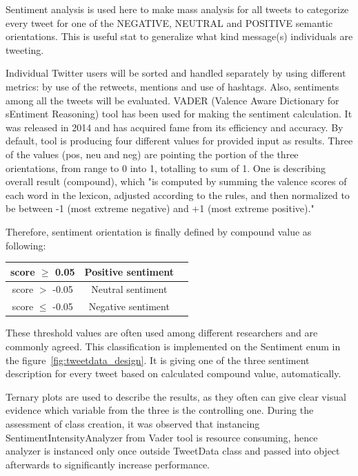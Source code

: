 Sentiment analysis is used here to make mass analysis for all tweets to categorize every tweet for one of the NEGATIVE, NEUTRAL and POSITIVE semantic orientations.
This is useful stat to generalize what kind message(s) individuals are tweeting.

Individual Twitter users will be sorted and handled separately by using different metrics: by use of the retweets, mentions and use of hashtags.
Also, sentiments among all the tweets will be evaluated.
VADER (Valence  Aware  Dictionary  for  sEntiment  Reasoning) tool\cite{Hutto_Gilbert_2014} has been used for making the sentiment calculation.
It was released in 2014 and has acquired fame from its efficiency and accuracy.
By default, tool is producing four different values for provided input as results.
Three of the values (pos, neu and neg) are pointing the portion of the three orientations, from range to 0 into 1, totalling to sum of 1.
One is describing overall result (compound), which "is computed by summing the valence scores of each word in the lexicon, adjusted according to the rules, and then normalized to be between -1 (most extreme negative) and +1 (most extreme positive)."

Therefore, sentiment orientation is finally defined by compound value as following:

\begin{center}
    \begin{tabular}{ |c|c|c| }
        \hline
        score $\geq$ 0.05 & Positive sentiment \\
        \hline
        score $>$ -0.05 & Neutral sentiment \\
        \hline
        score $\leq$ -0.05 & Negative sentiment \\
        \hline
    \end{tabular}
\end{center}

These threshold values are often used among different researchers and are commonly agreed.
This classification is implemented on the Sentiment enum in the figure~\ref{fig:tweetdata_design}.
It is giving one of the three sentiment description for every tweet based on calculated compound value, automatically.

Ternary plots are used to describe the results, as they often can give clear visual evidence which variable from the three is  the controlling one.
During the assessment of class creation, it was observed that instancing SentimentIntensityAnalyzer from Vader tool is resource consuming, hence
analyzer is instanced only once outside TweetData class and passed into object afterwards to significantly increase performance.


